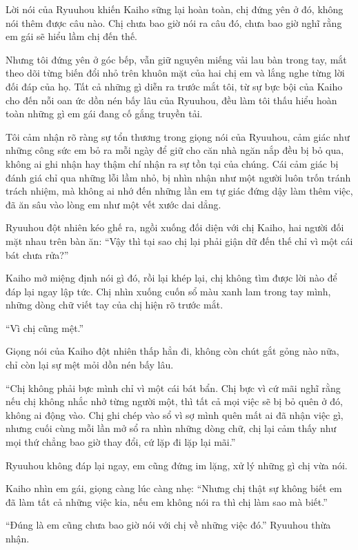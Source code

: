 \documentclass[../main.tex]{subfiles}
\begin{document}
Lời nói của Ryuuhou khiến Kaiho sững lại hoàn toàn, chị đứng yên ở đó, không nói thêm được câu nào. Chị chưa bao giờ nói ra câu đó, chưa bao giờ nghĩ rằng em gái sẽ hiểu lầm chị đến thế.

Nhưng tôi đứng yên ở góc bếp, vẫn giữ nguyên miếng vải lau bàn trong tay, mắt theo dõi từng biến đổi nhỏ trên khuôn mặt của hai chị em và lắng nghe từng lời đối đáp của họ. Tất cả những gì diễn ra trước mắt tôi, từ sự bực bội của Kaiho cho đến nỗi oan ức dồn nén bấy lâu của Ryuuhou, đều làm tôi thấu hiểu hoàn toàn những gì em gái đang cố gắng truyền tải.

Tôi cảm nhận rõ ràng sự tổn thương trong giọng nói của Ryuuhou, cảm giác như những công sức em bỏ ra mỗi ngày để giữ cho căn nhà ngăn nắp đều bị bỏ qua, không ai ghi nhận hay thậm chí nhận ra sự tồn tại của chúng. Cái cảm giác bị đánh giá chỉ qua những lỗi lầm nhỏ, bị nhìn nhận như một người luôn trốn tránh trách nhiệm, mà không ai nhớ đến những lần em tự giác đứng dậy làm thêm việc, đã ăn sâu vào lòng em như một vết xước dai dẳng.

Ryuuhou đột nhiên kéo ghế ra, ngồi xuống đối diện với chị Kaiho, hai người đối mặt nhau trên bàn ăn: ``Vậy thì tại sao chị lại phải giận dữ đến thế chỉ vì một cái bát chưa rửa?''

Kaiho mở miệng định nói gì đó, rồi lại khép lại, chị không tìm được lời nào để đáp lại ngay lập tức. Chị nhìn xuống cuốn sổ màu xanh lam trong tay mình, những dòng chữ viết tay của chị hiện rõ trước mắt.

``Vì chị cũng mệt.''

Giọng nói của Kaiho đột nhiên thấp hẳn đi, không còn chút gắt gỏng nào nữa, chỉ còn lại sự mệt mỏi dồn nén bấy lâu.

``Chị không phải bực mình chỉ vì một cái bát bẩn. Chị bực vì cứ mãi nghĩ rằng nếu chị không nhắc nhở từng người một, thì tất cả mọi việc sẽ bị bỏ quên ở đó, không ai động vào. Chị ghi chép vào sổ vì sợ mình quên mất ai đã nhận việc gì, nhưng cuối cùng mỗi lần mở sổ ra nhìn những dòng chữ, chị lại cảm thấy như mọi thứ chẳng bao giờ thay đổi, cứ lặp đi lặp lại mãi.''

Ryuuhou không đáp lại ngay, em cũng đứng im lặng, xử lý những gì chị vừa nói.

Kaiho nhìn em gái, giọng càng lúc càng nhẹ: ``Nhưng chị thật sự không biết em đã làm tất cả những việc kia, nếu em không nói ra thì chị làm sao mà biết.''

``Đúng là em cũng chưa bao giờ nói với chị về những việc đó.'' Ryuuhou thừa nhận.
\end{document}
